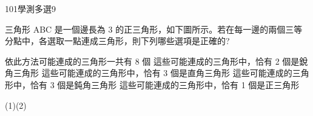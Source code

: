     \begin{QUESTION}
        \begin{ExamInfo}{101}{學測}{多選}{9}
        \end{ExamInfo}
        \begin{ExamAnsRateInfo}{51}{77}{51}{25}
        \end{ExamAnsRateInfo}
        \begin{QBODY}
            三角形 ABC 是一個邊長為 3 的正三角形，如下圖所示。若在每一邊的兩個三等分點中，各選取一點連成三角形，則下列哪些選項是正確的?

			\begin{QOPS} 
				\QOP 依此方法可能連成的三角形一共有 8 個
				\QOP 這些可能連成的三角形中，恰有 2 個是銳角三角形 \QOP 這些可能連成的三角形中，恰有 3 個是直角三角形
				\QOP 這些可能連成的三角形中，恰有 3 個是鈍角三角形
				\QOP 這些可能連成的三角形中，恰有 1 個是正三角形
			\end{QOPS}
        \end{QBODY}
        \begin{QFROMS}
        \end{QFROMS}
        \begin{QTAGS}\end{QTAGS}
        \begin{QANS}
            (1)(2)
        \end{QANS}
        \begin{QSOLLIST}
        \end{QSOLLIST}
        \begin{QEMPTYSPACE}
        \end{QEMPTYSPACE}
    \end{QUESTION}
